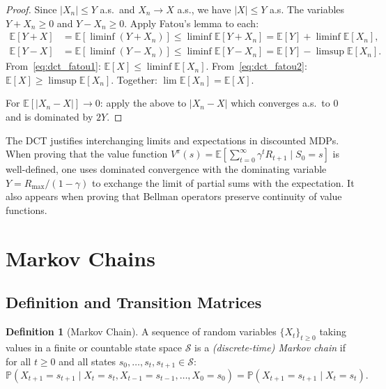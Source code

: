 \documentclass[11pt,a4paper]{article}
\theoremstyle{definition}
\newtheorem{definition}{Definition}[section]
\theoremstyle{plain}
\theoremstyle{remark}
\newcommand{\E}{\mathbb{E}}
\newcommand{\Prob}{\mathbb{P}}
\begin{document}
\begin{proof}
Since $|X_n| \leq Y$ a.s.\ and $X_n \to X$ a.s., we have $|X| \leq Y$ a.s. The variables $Y + X_n \geq 0$ and $Y - X_n \geq 0$. Apply Fatou's lemma to each:
\begin{align}
    \E[Y + X] &= \E[\liminf(Y + X_n)] \leq \liminf \E[Y + X_n] = \E[Y] + \liminf \E[X_n], \label{eq:dct_fatou1}\\
    \E[Y - X] &= \E[\liminf(Y - X_n)] \leq \liminf \E[Y - X_n] = \E[Y] - \limsup \E[X_n]. \label{eq:dct_fatou2}
\end{align}
From~\eqref{eq:dct_fatou1}: $\E[X] \leq \liminf \E[X_n]$. From~\eqref{eq:dct_fatou2}: $\E[X] \geq \limsup \E[X_n]$. Together: $\lim \E[X_n] = \E[X]$.

For $\E[|X_n - X|] \to 0$: apply the above to $|X_n - X|$ which converges a.s.\ to $0$ and is dominated by $2Y$.
\end{proof}

\begin{rlconnection}[Connection to RL]
The DCT justifies interchanging limits and expectations in discounted MDPs. When proving that the value function $V^\pi(s) = \E[\sum_{t=0}^\infty \gamma^t R_{t+1} \mid S_0 = s]$ is well-defined, one uses dominated convergence with the dominating variable $Y = R_{\max}/(1-\gamma)$ to exchange the limit of partial sums with the expectation. It also appears when proving that Bellman operators preserve continuity of value functions.
\end{rlconnection}

\section{Markov Chains}
\label{sec:markov_chains}

\subsection{Definition and Transition Matrices}
\label{subsec:mc_def}

\begin{definition}[Markov Chain]
\label{def:markov_chain}
A sequence of random variables $\{X_t\}_{t \geq 0}$ taking values in a finite or countable state space $\mathcal{S}$ is a \emph{(discrete-time) Markov chain} if for all $t \geq 0$ and all states $s_0, \ldots, s_t, s_{t+1} \in \mathcal{S}$:
\begin{equation}
    \Prob(X_{t+1} = s_{t+1} \mid X_t = s_t, X_{t-1} = s_{t-1}, \ldots, X_0 = s_0) = \Prob(X_{t+1} = s_{t+1} \mid X_t = s_t).
    \label{eq:markov_property}
\end{equation}
\end{definition}
\end{document}

